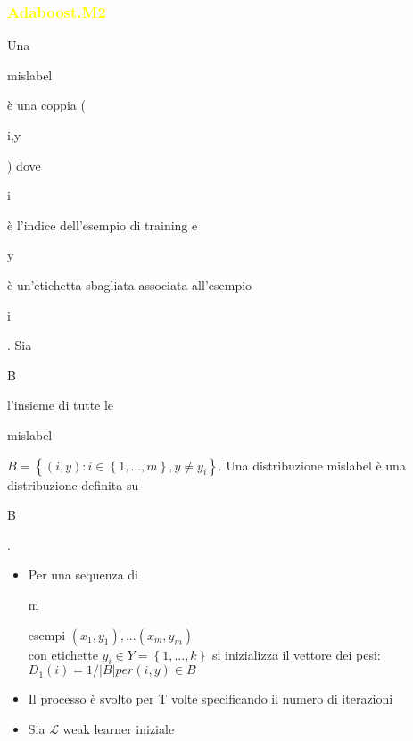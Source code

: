 \documentclass[handout
]{beamer}
\def\yellow#1{{\textcolor{yellow}{#1}}}
\begin{document}
\begin{frame}
\frametitle{\yellow{Adaboost.M2}}
Una \begin{it}mislabel\end{it}  \`e una coppia (\begin{it}i,y\end{it}) dove \begin{it}i\end{it}
 \`e l'indice dell'esempio di training e \begin{it}y\end{it} \`e un'etichetta sbagliata associata 
all'esempio \begin{it}i\end{it}. Sia \begin{it}B\end{it} l'insieme di tutte le \begin{it}mislabel\end{it} 
\begin{math}B=\left\{(i,y) : i \in \left\{1, ..., m \right\}, y \ne y_i \right\}\end{math}. 
Una distribuzione mislabel \`e una distribuzione definita su \begin{it}B\end{it}.
\begin{itemize}
\item Per una sequenza di \begin{it}m\end{it} esempi \begin{math}(x_1,y_1), ... (x_m,y_m)\end{math}\\
con etichette \begin{math}y_i\in Y = \left\{1, ..., k\right\}\end{math} si inizializza il vettore dei pesi: \begin{math} D_1(i)=1/|B| per (i,y) \in B \end{math}
\item Il processo \`e svolto per T volte specificando il numero di iterazioni
\item Sia \begin{math} \mathcal{L} \end{math} weak learner iniziale

\end{itemize}
\end{frame}
\end{document}
